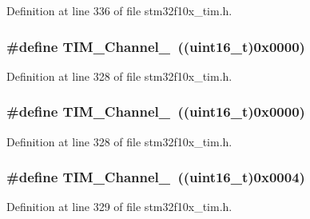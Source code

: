 Definition at line 336 of file stm32f10x\+\_\+tim.\+h.

\subsubsection[{\texorpdfstring{T\+I\+M\+\_\+\+Channel\+\_\+1}{TIM_Channel_1}}]{\setlength{\rightskip}{0pt plus 5cm}\#define T\+I\+M\+\_\+\+Channel\+\_~(({\bf uint16\+\_\+t})0x0000)}\hypertarget{group___t_i_m___channel_ga69ea7f558f02c63dd1082d784d2449bd}{}\label{group___t_i_m___channel_ga69ea7f558f02c63dd1082d784d2449bd}


Definition at line 328 of file stm32f10x\+\_\+tim.\+h.

\subsubsection[{\texorpdfstring{T\+I\+M\+\_\+\+Channel\+\_\+1}{TIM_Channel_1}}]{\setlength{\rightskip}{0pt plus 5cm}\#define T\+I\+M\+\_\+\+Channel\+\_~(({\bf uint16\+\_\+t})0x0000)}\hypertarget{group___t_i_m___channel_ga69ea7f558f02c63dd1082d784d2449bd}{}\label{group___t_i_m___channel_ga69ea7f558f02c63dd1082d784d2449bd}


Definition at line 328 of file stm32f10x\+\_\+tim.\+h.

\subsubsection[{\texorpdfstring{T\+I\+M\+\_\+\+Channel\+\_\+2}{TIM_Channel_2}}]{\setlength{\rightskip}{0pt plus 5cm}\#define T\+I\+M\+\_\+\+Channel\+\_~(({\bf uint16\+\_\+t})0x0004)}\hypertarget{group___t_i_m___channel_ga03d7da8269a87a560f68985b4bd80931}{}\label{group___t_i_m___channel_ga03d7da8269a87a560f68985b4bd80931}


Definition at line 329 of file stm32f10x\+\_\+tim.\+h.

